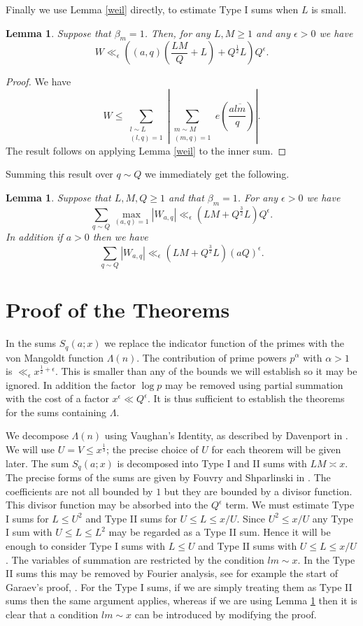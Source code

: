 \documentclass[12pt]{article}
\newcommand{\twosum}[2]{\sum_{\substack{#1\\#2}}}
\newtheorem{lem}[defn]{Lemma}
\begin{document}
Finally we use Lemma \ref{weil} directly, to estimate Type I sums when $L$ is small.

\begin{lem}
Suppose that $\beta_m=1$.  Then, for any $L,M\geq 1$ 
and any $\epsilon>0$ we have 
$$W\ll_\epsilon ((a,q)(\frac{LM}{Q}+L)+Q^{\frac12}L)Q^\epsilon.$$
\end{lem}
\begin{proof}
We have 
$$W\leq \twosum{l\sim L}{(l,q)=1}\left|\twosum{m\sim M}{(m,q)=1}e(\frac{a\overline{lm}}{q})\right|.$$
The result follows on applying Lemma \ref{weil} to the inner sum.
\end{proof}

Summing this result over $q\sim Q$ we immediately get the following.

\begin{lem}\label{typei}
Suppose that $L,M,Q\geq 1$ 
and that $\beta_m=1$.  For any $\epsilon>0$ we have 
$$\sum_{q\sim Q}\max_{(a,q)=1}|W_{a,q}|\ll_\epsilon (LM+Q^{\frac32}L)Q^\epsilon.$$
In addition if $a>0$ then we have 
$$\sum_{q\sim Q}|W_{a,q}|\ll_\epsilon (LM+Q^{\frac32}L)(aQ)^\epsilon.$$
\end{lem}

\section{Proof of the Theorems} 

In the sums $S_q(a;x)$ we replace the indicator function of the primes with the von Mangoldt function $\Lambda(n)$.  The contribution of prime powers $p^\alpha$ with $\alpha>1$ is $\ll_\epsilon x^{\frac12+\epsilon}$.  This is smaller than any of the bounds we will establish so it may be ignored.  In addition the factor $\log p$ may be removed using partial summation with the cost of a factor $x^\epsilon\ll Q^\epsilon$.   It is thus sufficient to establish the theorems for the sums containing $\Lambda$.

We decompose $\Lambda(n)$ using Vaughan's Identity, as described by
Davenport in \cite[Chapter 24]{dav}.  We will use $U=V\leq
x^{\frac13}$; the precise choice of $U$ for each theorem will be given
later.  The sum $S_q(a;x)$ is decomposed into Type I and II sums with
$LM\asymp x$.  The precise forms of the sums are given by Fouvry and
Shparlinski in \cite{foushpar}.  The coefficients are not all bounded
by $1$ but they are bounded by a divisor function.  This divisor
function may be absorbed into the $Q^\epsilon$ term.  We must estimate
Type I sums for $L\leq U^2$ and Type II sums for $U\leq L\leq x/U$.
 Since $U^2\le x/U$ any Type I sum with $U\le L\le L^2$ may be
regarded as a Type II sum.  Hence it will be enough to consider Type
I sums with $L\leq U$ and Type II sums with $U\leq L\leq x/U$.  The variables of summation are restricted by the condition $lm\sim x$.
In the Type II sums this may be removed by Fourier analysis, see for
example the start of Garaev's proof, \cite[Lemma 2.4]{garaev}. 
 For the Type I sums, if we are simply treating them as Type II sums
 then the same argument applies, whereas if we are using Lemma
 \ref{typei} then it is clear that a condition $lm\sim x$ can be
 introduced by modifying the proof. 
\end{document}
